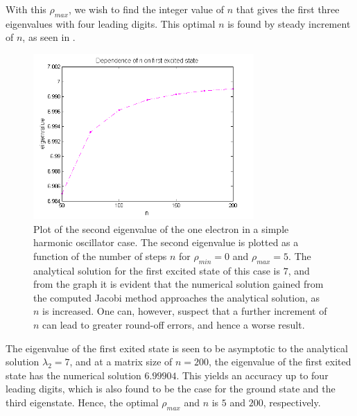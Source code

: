 With this $\rho_{max}$, we wish to find the integer value of $n$ that gives the first three eigenvalues with four leading digits. 
This optimal $n$ is found by steady increment of $n$, as seen in .
\begin{figure}[H]
	\centering
	\includegraphics[width=0.75\textwidth]{Figures/MatrixSizeOnEigenvalue_2state.png}
	\caption{Plot of the second eigenvalue of the one electron in a simple harmonic oscillator case. The second eigenvalue is plotted as a function of the number of steps $n$ for $\rho_{min} = 0$ and $\rho_{max} = 5$. The analytical solution for the first excited state of this case is $7$, and from the graph it is evident that the numerical solution gained from the computed Jacobi method approaches the analytical solution, as $n$ is increased. One can, however, suspect that a further increment of $n$ can lead to greater round-off errors, and hence a worse result.}
	\label{fig:DependenceOnEigenvalue2}
\end{figure}
The eigenvalue of the first exited state is seen to be asymptotic to the analytical solution $\lambda_2 = 7$, and at a matrix size of $n=200$,  the eigenvalue of the first exited state has the numerical solution $6.99904$. 
This yields an accuracy up to four leading digits, which is also found to be the case for the ground state and the third eigenstate.
Hence, the optimal $\rho_{max}$ and $n$ is $5$ and $200$, respectively. 
